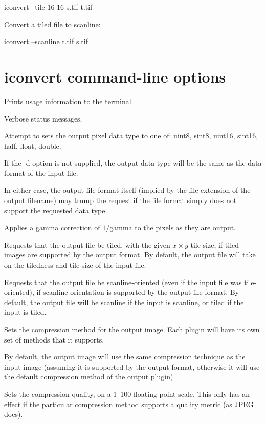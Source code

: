 \begin{code}
    iconvert --tile 16 16 s.tif t.tif
\end{code}

\noindent Convert a tiled file to scanline:

\begin{code}
    iconvert --scanline t.tif s.tif
\end{code}


\section{{\cf iconvert} command-line options}

Prints usage information to the terminal.
\apiend

Verbose status messages.
\apiend


Attempt to sets the output pixel data type to one of: {\cf uint8}, 
{\cf sint8}, {\cf uint16}, {\cf sint16}, {\cf half}, {\cf float}, 
{\cf double}.

If the {\cf -d} option is not supplied, the output data type will
be the same as the data format of the input file.

In either case, the output file format itself (implied by the file
extension of the output filename) may trump the request if the file
format simply does not support the requested data type.
\apiend

Applies a gamma correction of $1/\mathrm{gamma}$ to the pixels as they
are output.
\apiend

Requests that the output file be tiled, with the given $x \times y$ 
tile size, if tiled images are supported by the output format.
By default, the output file will take on the tiledness and tile size
of the input file.
\apiend

Requests that the output file be scanline-oriented (even if the input
file was tile-oriented), if scanline orientation is supported by the
output file format.  By default, the output file will be scanline
if the input is scanline, or tiled if the input is tiled.
\apiend

Sets the compression method for the output image.  Each \ImageOutput
plugin will have its own set of methods that it supports.

By default, the output image will use the same compression technique as
the input image (assuming it is supported by the output format,
otherwise it will use the default compression method of the output
plugin).  
\apiend

Sets the compression quality, on a 1--100 floating-point scale.
This only has an effect if the particular compression method supports
a quality metric (as JPEG does).
\apiend
